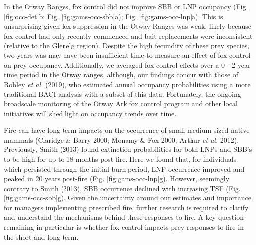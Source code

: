 \documentclass[11pt,a4paper,titlepage,twoside,openright]{style/unimelbthesis}
\begin{document}
\begin{mainmatter}
In the Otway Ranges, fox control did not improve SBB or LNP occupancy (Fig. \ref{fig:occ-det}b; Fig. \ref{fig:gams-occ-sbb}a); Fig. \ref{fig:gams-occ-lnp}a). This is unsurprising given fox suppression in the Otway Ranges was weak, likely because fox control had only recently commenced and bait replacements were inconsistent (relative to the Glenelg region). Despite the high fecundity of these prey species, two years was may have been insufficient time to measure an effect of fox control on prey occupancy. Additionally, we averaged fox control effects over a 0 - 2 year time period in the Otway ranges, although, our findings concur with those of Robley \emph{et al.} (2019), who estimated annual occupancy probabilities using a more traditional BACI analysis with a subset of this data. Fortunately, the ongoing broadscale monitoring of the Otway Ark fox control program and other local initiatives will shed light on occupancy trends over time.

Fire can have long-term impacts on the occurrence of small-medium sized native mammals (Claridge \& Barry 2000; Monamy \& Fox 2000; Arthur \emph{et al.} 2012). Previously, Smith (2013) found extinction probabilities for both LNPs and SBB's to be high for up to 18 months post-fire. Here we found that, for individuals which persisted through the initial burn period, LNP occurrence improved and peaked in 20 years post-fire (Fig. \ref{fig:gams-occ-lnp}g). However, seemingly contrary to Smith (2013), SBB occurrence declined with increasing TSF (Fig. \ref{fig:gams-occ-sbb}g). Given the uncertainty around our estimates and importance for managers implementing prescribed fire, further research is required to clarify and understand the mechanisms behind these responses to fire. A key question remaining in particular is whether fox control impacts prey responses to fire in the short and long-term.


\end{mainmatter}
\end{document}
